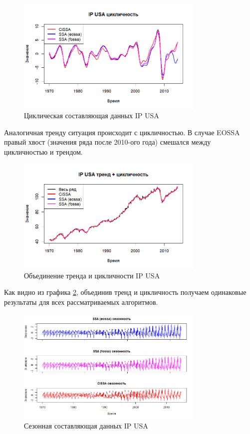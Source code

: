 \documentclass[a4paper, 11pt]{article}
\begin{document}
\begin{figure}[H]
	\centering
	\includegraphics[width=0.8\textwidth]{img/trend inseparability example/IP_cycle.png}
	\caption{Циклическая составляющая данных IP USA}
	\label{fig:IP_cycle}
\end{figure}

Аналогичная тренду ситуация происходит с цикличностью. В случае EOSSA правый хвост (значения ряда после 2010-ого года) смешался между цикличностью и трендом.

\begin{figure}[H]
	\centering
	\includegraphics[width=0.8\textwidth]{img/trend inseparability example/IP_trend_sycle.png}
	\caption{Объединение тренда и цикличности IP USA}
	\label{fig:IP_trend_sycle}
\end{figure}

Как видно из графика \ref{fig:IP_trend_sycle}, объединив тренд и цикличность получаем одинаковые результаты для всех рассматриваемых алгоритмов.

\begin{figure}[H]
	\centering
	\includegraphics[width=0.8\textwidth]{img/trend inseparability example/IP_sesonal.jpg}
	\caption{Сезонная составляющая данных IP USA}
	\label{fig:IP_sesonal}
\end{figure}
\end{document}
